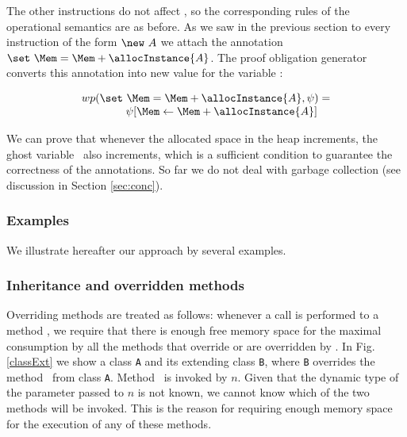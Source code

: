 The other instructions do not affect \Mem, so the corresponding rules of the operational semantics are as before. As we saw in the previous section to every
instruction of the form $\new\ A$ we attach the annotation $\set\ \Mem = \Mem + \allocInstance{A}$. The proof obligation generator converts this annotation into new value for the variable \Mem:

$$
\begin{array}{l}
wp(\set \ \Mem = \Mem + \allocInstance{A}, \psi) = \\
\ \ \ \ \ \ \ \ \ \ \ \ \psi[ \Mem \leftarrow \Mem + \allocInstance{A} ]
\end{array}
$$

We can prove that whenever the allocated space in the heap increments, 
the ghost variable \Mem\ also increments, which is a sufficient condition to guarantee the correctness of the annotations. 
So far we do not deal with garbage collection (see discussion in Section \ref{sec:conc}).

\subsubsection{Examples}
We illustrate hereafter our approach by several examples. 

\subsubsection{Inheritance and overridden methods} Overriding methods are treated as follows: whenever a call is performed to a method \method,
we require that there is enough free memory space for the maximal
consumption by all the  methods that override or are overridden by
\method. In Fig. \ref{classExt} we show a class \verb!A! and its
extending class \verb!B!, where \verb!B! overrides the method \method\ from class \verb!A!. Method \method\ is invoked by $n$. Given that the dynamic type of the parameter passed to $n$ is not known, we cannot know which of the two
methods will be invoked. This is the reason for requiring enough memory space for the execution of any of these methods.


